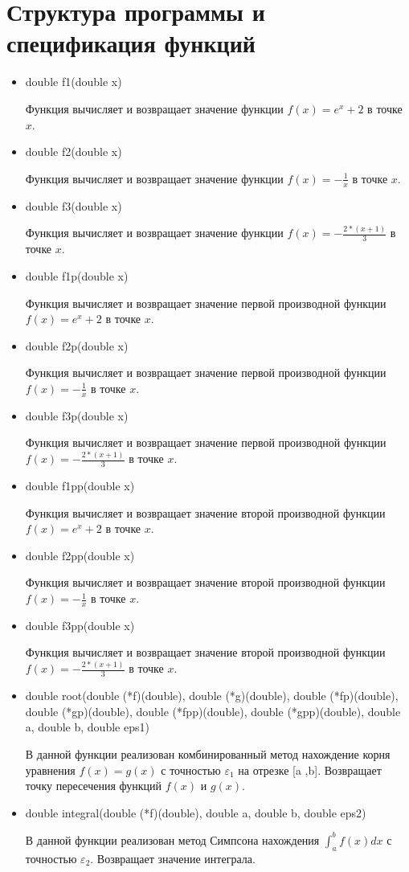 \documentclass[a4paper,12pt,titlepage,finall]{article}
\begin{document}
\newpage

\section{Структура программы и спецификация функций}

\begin{itemize}
\item double f1(double x) \par
    Функция вычисляет и возвращает значение функции $f(x) = e^x+2$ в точке $x$.
\item double f2(double x) \par
    Функция вычисляет и возвращает значение функции $f(x) = -\frac{1}{x}$ в точке $x$.
\item double f3(double x) \par
    Функция вычисляет и возвращает значение функции $f(x) = -\frac{2*(x+1)}{3}$ в точке $x$.
\item double f1p(double x) \par
    Функция вычисляет и возвращает значение первой производной функции $f(x) = e^x+2$ в точке $x$.
\item double f2p(double x) \par
    Функция вычисляет и возвращает значение первой производной функции $f(x) = -\frac{1}{x}$ в точке $x$.
\item double f3p(double x) \par
    Функция вычисляет и возвращает значение первой производной функции $f(x) = -\frac{2*(x+1)}{3}$ в точке $x$.
\item double f1pp(double x) \par
    Функция вычисляет и возвращает значение второй производной функции $f(x) = e^x+2$ в точке $x$.
\item double f2pp(double x) \par
    Функция вычисляет и возвращает значение второй производной функции $f(x) = -\frac{1}{x}$ в точке $x$.
\item double f3pp(double x) \par
    Функция вычисляет и возвращает значение второй производной функции $f(x) = -\frac{2*(x+1)}{3}$ в точке $x$.
\item double root(double (*f)(double), double (*g)(double), double (*fp)(double), double (*gp)(double), double (*fpp)(double), double (*gpp)(double), double a, double b, double eps1) \par
    В данной функции реализован комбинированный метод нахождение корня уравнения $f(x) = g(x)$ с точностью $\varepsilon_1$ на отрезке [a ,b]. Возвращает точку пересечения функций $f(x)$ и $g(x)$.
\item double integral(double (*f)(double), double a, double b, double eps2) \par
    В данной функции реализован метод Симпсона нахождения $\int_a^b f(x)dx$ с точностью $\varepsilon_2$. Возвращает значение интеграла.
\end{itemize}
\end{document}
